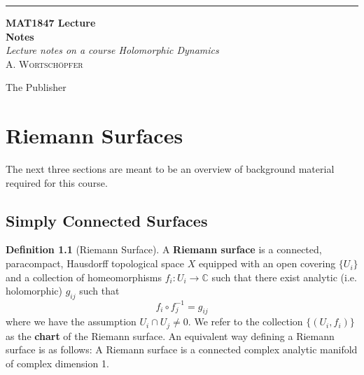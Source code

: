 \documentclass[a4paper, 11pt]{book}
\newcommand*{\plogo}{\fbox{$\mathcal{DB}$}}
\theoremstyle{definition}
\newtheorem{definition}{Definition}[section]
\theoremstyle{remark}
\begin{document}
    \begin{titlepage} 
        \raggedleft

        \rule{1pt}{\textheight} %
        \hspace{0.05\textwidth} %
        \parbox[b]{0.75\textwidth}{ %
                            
            {\Huge\bfseries MAT1847 Lecture \\[0.5\baselineskip] Notes }\\[2\baselineskip] %
            {\large\textit{Lecture notes on a course Holomorphic Dynamics}}\\[4\baselineskip] %
            {\Large\textsc{A. Wortschöpfer}} %
                                                    
            \vspace{0.5\textheight} %
                                                            
            {\noindent The Publisher~~\plogo}\\[\baselineskip] %
        }
    \end{titlepage}

    \chapter{Riemann Surfaces}

    The next three sections are meant to be an overview of background material required for this course.

    \section{Simply Connected Surfaces}

    \begin{definition}[Riemann Surface]
        A \textbf{Riemann surface} is a connected, paracompact, Hausdorff topological space $X$ equipped with an open covering $\{U_i\}$ 
        and a collection of homeomorphisms $f_i: U_i\to\mathbb{C}$ such that there exist analytic (i.e. holomorphic) $g_{ij}$ 
        such that
        \[ f_i \circ f_j^{-1} = g_{ij} \]
        where we have the assumption $U_i\cap U_j\neq 0$. We refer to the collection $\{(U_i,f_i)\}$ as the \textbf{chart} of 
        the Riemann surface. An equivalent way defining a Riemann surface is as follows:
        A Riemann surface is a connected complex analytic manifold of complex dimension 1.
    \end{definition}
\end{document}

